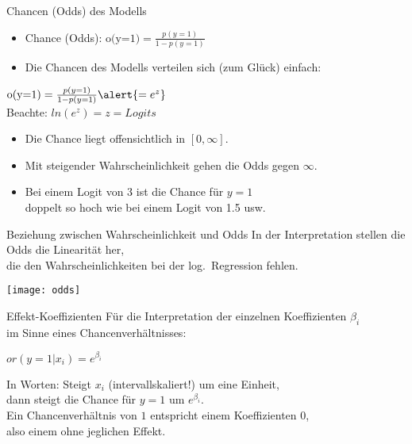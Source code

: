 \begin{frame}
  {Chancen (Odds) des Modells}
  \begin{itemize}[<+->]
    \item Chance (Odds): $\text{o(y=1)} = \frac{p(y=1)}{1-p(y=1)}$
    \item Die Chancen des Modells verteilen sich (zum Glück) einfach:
  \end{itemize}
  \pause
  \begin{center}
    $\text{o(y=1)} = \frac{p(y=1)}{1-p(y=1)}\alert{=e^z}$\\[3ex]
    Beachte: $ln(e^z)=z=Logits$
  \end{center}
  \pause
  \begin{itemize}[<+->]
    \item Die Chance liegt offensichtlich in $[0, \infty]$.
    \item Mit steigender Wahrscheinlichkeit gehen die Odds gegen $\infty$.
    \item Bei einem Logit von 3 ist die Chance für $y=1$\\
      doppelt so hoch wie bei einem Logit von 1.5 usw.
  \end{itemize}
\end{frame}

\begin{frame}
  {Beziehung zwischen Wahrscheinlichkeit und Odds}
  In der Interpretation stellen die Odds die Linearität her,\\
  die den Wahrscheinlichkeiten bei der log.\ Regression fehlen.
  \begin{center}
    \texttt{[image: odds]}
  \end{center}
\end{frame}

\begin{frame}
  {Effekt-Koeffizienten}
  Für die Interpretation der einzelnen Koeffizienten $\beta_i$\\
  im Sinne eines Chancenverhältnisses:
  \begin{center}
    \alert{$or(y=1|x_i)=e^{\beta_i}$}
  \end{center}
  \pause
  In Worten: Steigt $x_i$ (intervallskaliert!) um eine Einheit,\\
  dann steigt die Chance für $y=1$ um $e^{\beta_i}$.\\
  \vspace{0.5cm}
  \pause
  Ein Chancenverhältnis von $1$ entspricht einem Koeffizienten $0$,\\
  also einem ohne jeglichen Effekt.
\end{frame}

